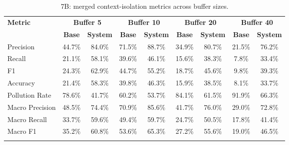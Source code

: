 \begin{table}[htbp]
\caption{7B: merged context-isolation metrics across buffer sizes.}\label{tab:7b_context_main}
\centering
\scriptsize
\setlength{\tabcolsep}{3pt}
\begin{adjustbox}{width=\textwidth}
\begin{tabular}{lcccccccc}
\toprule
\textbf{Metric} & \multicolumn{2}{c}{\textbf{Buffer 5}} & \multicolumn{2}{c}{\textbf{Buffer 10}} & \multicolumn{2}{c}{\textbf{Buffer 20}} & \multicolumn{2}{c}{\textbf{Buffer 40}} \\
\cmidrule(lr){2-3}\cmidrule(lr){4-5}\cmidrule(lr){6-7}\cmidrule(lr){8-9}
 & \textbf{Base} & \textbf{System} & \textbf{Base} & \textbf{System} & \textbf{Base} & \textbf{System} & \textbf{Base} & \textbf{System} \\
\midrule
Precision & 44.7\% & 84.0\% & 71.5\% & 88.7\% & 34.9\% & 80.7\% & 21.5\% & 76.2\% \\
Recall & 21.1\% & 58.1\% & 39.6\% & 46.1\% & 15.6\% & 38.3\% & 7.8\% & 33.4\% \\
F1 & 24.3\% & 62.9\% & 44.7\% & 55.2\% & 18.7\% & 45.6\% & 9.8\% & 39.3\% \\
Accuracy & 21.4\% & 58.3\% & 39.8\% & 46.3\% & 15.9\% & 38.5\% & 8.1\% & 33.7\% \\
Pollution Rate & 78.6\% & 41.7\% & 60.2\% & 53.7\% & 84.1\% & 61.5\% & 91.9\% & 66.3\% \\
Macro Precision & 48.5\% & 74.4\% & 70.9\% & 85.6\% & 41.7\% & 76.0\% & 29.0\% & 72.8\% \\
Macro Recall & 33.7\% & 59.6\% & 49.4\% & 59.7\% & 24.7\% & 50.5\% & 17.8\% & 41.4\% \\
Macro F1 & 35.2\% & 60.8\% & 53.6\% & 65.3\% & 27.2\% & 55.6\% & 19.0\% & 46.5\% \\
\botrule
\end{tabular}
\end{adjustbox}
\end{table}





